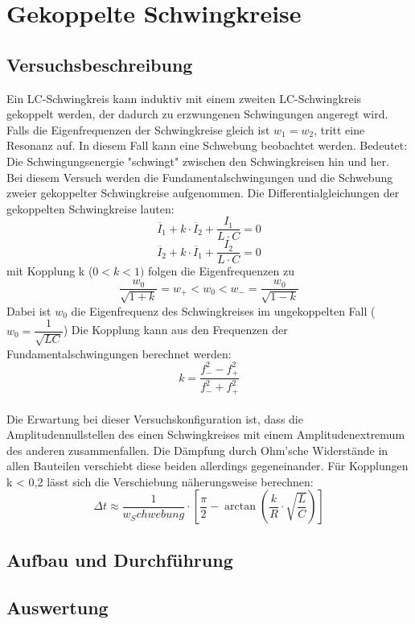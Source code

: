 \documentclass[12pt,a4paper]{article}
\begin{document}
\section{Gekoppelte Schwingkreise}
\subsection{Versuchsbeschreibung}
Ein LC-Schwingkreis kann induktiv mit einem zweiten LC-Schwingkreis gekoppelt werden, der dadurch zu erzwungenen Schwingungen angeregt wird. Falls die Eigenfrequenzen der Schwingkreise gleich ist $w_1 = w_2$, tritt eine Resonanz auf. In diesem Fall kann eine Schwebung beobachtet werden. Bedeutet: Die Schwingungsenergie "schwingt" zwischen den Schwingkreisen hin und her. \\
Bei diesem Versuch werden die Fundamentalschwingungen und die Schwebung zweier gekoppelter Schwingkreise aufgenommen. Die Differentialgleichungen der gekoppelten Schwingkreise lauten:
\begin{equation}
\ddot{I_1} + k \cdot \ddot{I_2} + \dfrac{I_1}{L \cdot C} = 0
\end{equation}
\begin{equation}
\ddot{I_2} + k \cdot \ddot{I_1} + \dfrac{I_2}{L \cdot C} = 0
\end{equation}
mit Kopplung k ($0 < k < 1)$ folgen die Eigenfrequenzen zu
\begin{equation}
\dfrac{w_0}{\sqrt{1+k}} = w_+ < w_0 < w_- = \dfrac{w_0}{\sqrt{1-k}} 
\end{equation}
Dabei ist $w_0$ die Eigenfrequenz des Schwingkreises im ungekoppelten Fall ($w_0 = \dfrac{1}{\sqrt{LC}}$)
Die Kopplung kann aus den Frequenzen der Fundamentalschwingungen berechnet werden:
\begin{equation}
k = \dfrac{f_-^2 - f_+^2}{f_-^2 + f_+^2}
\end{equation}
\\ Die Erwartung bei dieser Versuchskonfiguration ist, dass die Amplitudennullstellen des einen Schwingkreises mit einem Amplitudenextremum des anderen zusammenfallen. Die Dämpfung durch Ohm'sche Widerstände in allen Bauteilen verschiebt diese beiden allerdings gegeneinander. Für Kopplungen k < 0,2 lässt sich die Verschiebung näherungsweise berechnen:
\begin{equation}
\Delta t \approx \dfrac{1}{w_Schwebung} \cdot \left[\dfrac{\pi}{2} - \arctan \left( \dfrac{k}{R} \cdot \sqrt{\dfrac{L}{C}} \right)\right]
\end{equation}  
\subsection{Aufbau und Durchführung}
\subsection{Auswertung}
\end{document}
